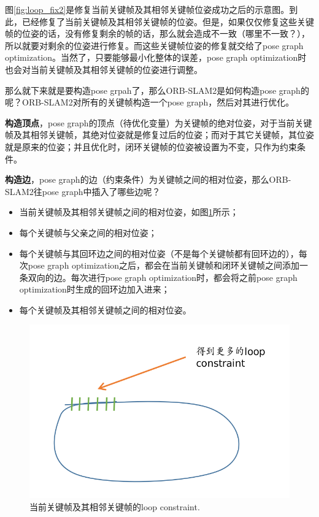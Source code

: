 图\ref{fig:loop_fix2}是修复当前关键帧及其相邻关键帧位姿成功之后的示意图。到此，已经修复了当前关键帧及其相邻关键帧的位姿。但是，如果仅仅修复这些关键帧的位姿的话，没有修复剩余的帧的话，那么就会造成不一致（哪里不一致？），所以就要对剩余的位姿进行修复。而这些关键帧位姿的修复就交给了pose graph optimization。当然了，只要能够最小化整体的误差，pose graph optimization时也会对当前关键帧及其相邻关键帧的位姿进行调整。

那么就下来就是要构造pose grpah了，那么ORB-SLAM2是如何构造pose graph的呢？ORB-SLAM2对所有的关键帧构造一个pose graph，然后对其进行优化。

\textbf{构造顶点}，pose graph的顶点（待优化变量）为关键帧的绝对位姿，对于当前关键帧及其相邻关键帧，其绝对位姿就是修复过后的位姿；而对于其它关键帧，其位姿就是原来的位姿；并且优化时，闭环关键帧的位姿被设置为不变，只作为约束条件。

\textbf{构造边}，pose graph的边（约束条件）为关键帧之间的相对位姿，那么ORB-SLAM2往pose graph中插入了哪些边呢？

\begin{itemize}
	\item 当前关键帧及其相邻关键帧之间的相对位姿，如图\ref{fig:more_loop_constarint}所示；
	\item 每个关键帧与父亲之间的相对位姿；
	\item 每个关键帧与其回环边之间的相对位姿（不是每个关键帧都有回环边的），每次pose graph optimization之后，都会在当前关键帧和闭环关键帧之间添加一条双向的边。每次进行pose graph optimization时，都会将之前pose graph optimization时生成的回环边加入进来；
	\item 每个关键帧及其相邻关键帧之间的相对位姿。
\end{itemize}

\begin{figure}[h]%
	\centering  %
	\includegraphics[width=0.5\linewidth]{image/ORB-SLAM/MoreLoopConstraint.png}  %
	\caption{当前关键帧及其相邻关键帧的loop constraint.}  %
	\label{fig:more_loop_constarint}   %
\end{figure}


